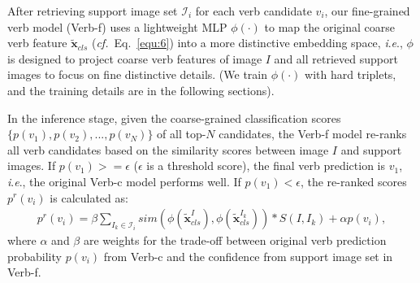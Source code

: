 \documentclass[letterpaper]{article} %
\newcommand{\ie}{\textit{i}.\textit{e}.}
\newcommand{\cf}{\textit{cf.}}
\newcommand{\lc}[1]{{\color{blue}{[Long: #1]}}}
\begin{document}


After retrieving support image set $\mathcal{I}_i$ for each verb candidate $v_i$, our fine-grained verb model (Verb-f) uses a lightweight MLP $\phi(\cdot)$ to map the original coarse verb feature $\tilde{\bm{x}}_{cls}$ (\cf~Eq.~\eqref{equ:6}) into a more distinctive embedding space, \ie, $\phi$ is designed to project coarse verb features of image $I$ and all retrieved support images to focus on fine distinctive details. (We train $\phi(\cdot)$ with hard triplets, and the training details are in the following sections).


In the inference stage, given the coarse-grained classification scores $\{p(v_1),p(v_2),...,p(v_N)\}$ of all top-$N$ candidates, the Verb-f model re-ranks all verb candidates based on the similarity scores between image $I$ and support images. If $p(v_1) >= \epsilon$ ($\epsilon$ is a threshold score), the final verb prediction is $v_1$, \ie, the original Verb-c model performs well. If $p(v_1) < \epsilon$, the re-ranked scores $p^r(v_i)$ is calculated as:
\begin{equation}
\begin{aligned}
p^r(v_i) = \beta \sum_{I_k \in \mathcal{I}_i} sim(\phi(\tilde{\bm{x}}_{cls}^I), \phi(\tilde{\bm{x}}_{cls}^{I_k})) * S(I, I_k) + \alpha p(v_i),
\end{aligned}
\end{equation}
where $\alpha$ and $\beta$ are weights for the trade-off between original verb prediction probability $p(v_i)$ from Verb-c and the confidence from support image set in Verb-f.
\end{document}
